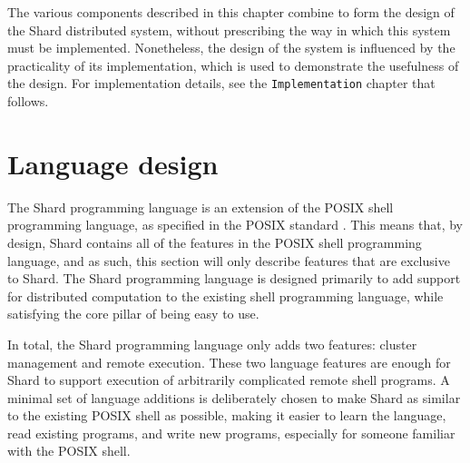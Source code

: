 \documentclass[twoside]{report}
\begin{document}
The various components described in this chapter combine to form the design of the Shard distributed system, without prescribing the way in which this system must be implemented.
Nonetheless, the design of the system is influenced by the practicality of its implementation, which is used to demonstrate the usefulness of the design.
For implementation details, see the \texttt{Implementation} chapter that follows.

\section{Language design}


The Shard programming language is an extension of the POSIX shell programming language, as specified in the POSIX standard \cite{posix2017}.
This means that, by design, Shard contains all of the features in the POSIX shell programming language, and as such, this section will only describe features that are exclusive to Shard.
The Shard programming language is designed primarily to add support for distributed computation to the existing shell programming language, while satisfying the core pillar of being easy to use.

In total, the Shard programming language only adds two features: cluster management and remote execution.
These two language features are enough for Shard to support execution of arbitrarily complicated remote shell programs.
A minimal set of language additions is deliberately chosen to make Shard as similar to the existing POSIX shell as possible, making it easier to learn the language, read existing programs, and write new programs, especially for someone familiar with the POSIX shell.
\end{document}
